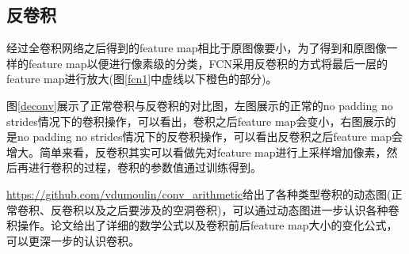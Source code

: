 \documentclass[cn]{elegantbook}
\begin{document}
\subsection{反卷积}
经过全卷积网络之后得到的feature map相比于原图像要小，为了得到和原图像一样的feature map以便进行像素级的分类，FCN采用反卷积的方式将最后一层的feature map进行放大(图\ref{fcn1}中虚线以下橙色的部分)。

图\ref{deconv}展示了正常卷积与反卷积的对比图，左图展示的正常的no padding no strides情况下的卷积操作，可以看出，卷积之后feature map会变小，右图展示的是no padding no strides情况下的反卷积操作，可以看出反卷积之后feature map会增大。简单来看，反卷积其实可以看做先对feature map进行上采样增加像素，然后再进行卷积的过程，卷积的参数值通过训练得到。

\href{https://github.com/vdumoulin/conv_arithmetic}{https://github.com/vdumoulin/conv\_arithmetic}给出了各种类型卷积的动态图(正常卷积、反卷积以及之后要涉及的空洞卷积)，可以通过动态图进一步认识各种卷积操作。论文\cite{dumoulin2016guide}给出了详细的数学公式以及卷积前后feature map大小的变化公式，可以更深一步的认识卷积。
\end{document}
